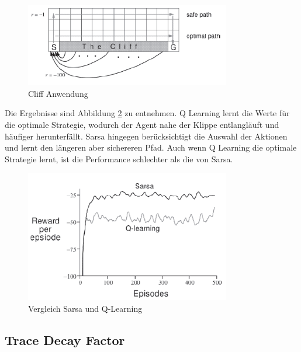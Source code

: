 \documentclass[10pt]{scrartcl}
\begin{document}
\begin{figure}[htbp]
	\centering	\includegraphics[width=0.8\textwidth]{Bilder/Cliff.png}
	\caption{Cliff Anwendung}
	\label{fig:Cliff}
\end{figure}

Die Ergebnisse sind Abbildung \ref{fig:Cliff_Result} zu entnehmen. Q Learning lernt die Werte für die optimale Strategie, wodurch der Agent nahe der Klippe entlangläuft und häufiger herunterfällt. Sarsa hingegen berücksichtigt die Auswahl der Aktionen und lernt den längeren aber sichereren Pfad. Auch wenn Q Learning die optimale Strategie lernt, ist die Performance schlechter als die von Sarsa.\\

\begin{figure}[htbp]
	\centering	\includegraphics[width=0.8\textwidth]{Bilder/Cliff_Ergebnisse.png}
	\caption{Vergleich Sarsa und Q-Learning}
	\label{fig:Cliff_Result}
\end{figure}


\subsection{Trace Decay Factor}
\end{document}
